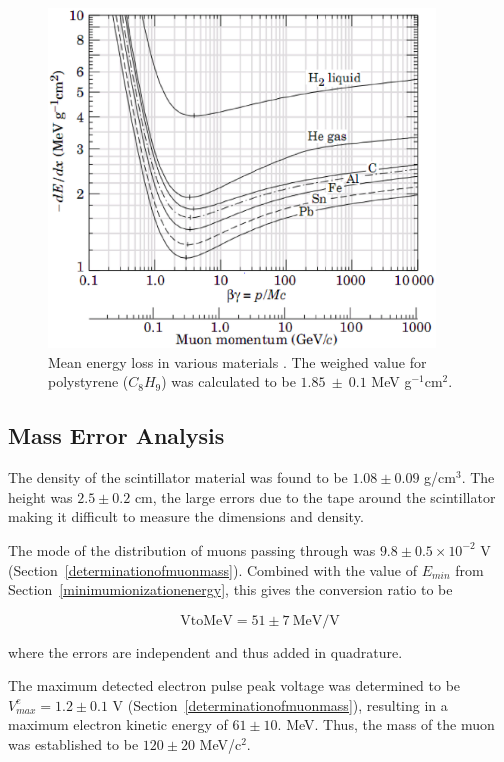 \label{energy_loss}
\begin{figure}[h]
\begin{center}
\includegraphics[height = 90mm]{figures/energy_loss.eps}
\caption{\small{Mean energy loss in various materials \cite{yao}. The
weighed value for polystyrene ($C_8H_9$) was calculated to be
$1.85~\pm~0.1$ MeV g$^{-1}$cm$^{2}$}.}
\label{figure:dEdx}
\end{center}
\end{figure}

\subsection{Mass Error Analysis}

The density of the scintillator material was found to be $1.08 \pm
0.09$ g/cm$^3$. The height was $2.5 \pm 0.2$ cm, the large errors due
to the tape around the scintillator making it difficult to measure the
dimensions and density.

The mode of the distribution of muons passing through was $9.8 \pm 0.5
\times 10^{-2}$ V (Section~\ref{determinationofmuonmass}). Combined
with the value of $E_{min}$ from Section~\ref{minimumionizationenergy},
this gives the conversion ratio to be

\begin{equation} \mathrm{VtoMeV} = 51 \pm 7~\mathrm{ MeV/V} \end{equation}   

where the errors are independent and thus added in quadrature.

The maximum detected electron pulse peak voltage was determined to be
$V_{max}^e = 1.2 \pm 0.1$ V (Section~\ref{determinationofmuonmass}),
resulting in a maximum electron kinetic energy of $61\pm 10.$
MeV. Thus, the mass of the muon was established to be $120 \pm 20$
MeV/c$^{2}$.

